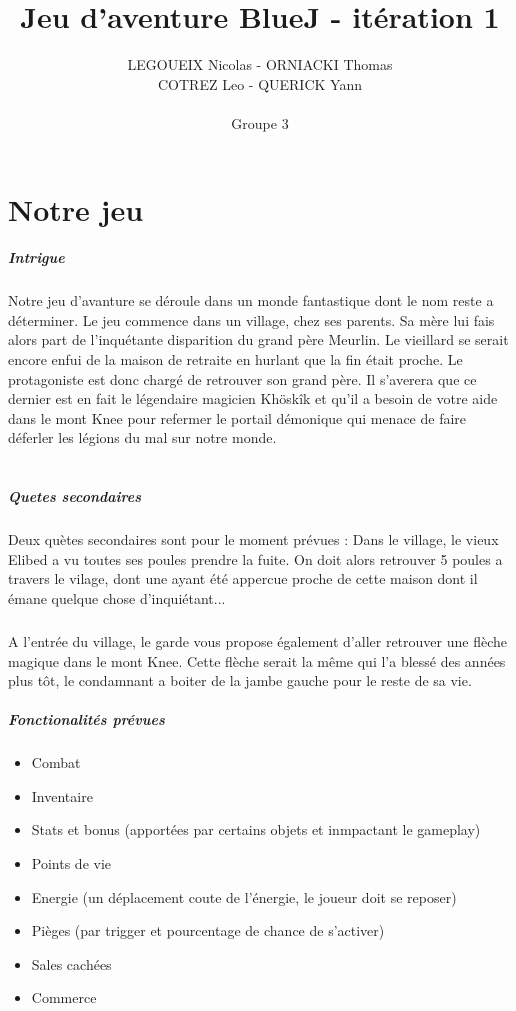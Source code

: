 \documentclass[11pt,a4paper]{report}
\author{LEGOUEIX Nicolas - ORNIACKI Thomas\\ COTREZ Leo - QUERICK Yann\\~\\ Groupe 3}
\title{Jeu d'aventure BlueJ - itération 1}
\begin{document}
\maketitle
\chapter{Notre jeu}
\paragraph{Intrigue}
Notre jeu d'avanture se déroule dans un monde fantastique dont le nom reste a déterminer. Le jeu commence dans un village, chez ses parents. Sa mère lui fais alors part de l'inquétante disparition du grand père Meurlin. Le vieillard se serait encore enfui de la maison de retraite en hurlant que la fin était proche. Le protagoniste est donc chargé de retrouver son grand père. Il s'averera que ce dernier est en fait le légendaire magicien Khöskîk et qu'il a besoin de votre aide dans le mont Knee pour refermer le portail démonique qui menace de faire déferler les légions du mal sur notre monde.\\~\\
\paragraph{Quetes secondaires}
Deux quètes secondaires sont pour le moment prévues : Dans le village, le vieux Elibed a vu toutes ses poules prendre la fuite. On doit alors retrouver 5 poules a travers le vilage, dont une ayant été appercue proche de cette maison dont il émane quelque chose d'inquiétant...
\paragraph{}
A l'entrée du village, le garde vous propose également d'aller retrouver une flèche magique dans le mont Knee. Cette flèche serait la même qui l'a blessé des années plus tôt, le condamnant a boiter de la jambe gauche pour le reste de sa vie.
\paragraph{Fonctionalités prévues}
\begin{itemize}
\item Combat
\item Inventaire
\item Stats et bonus (apportées par certains objets et inmpactant le gameplay)
\item Points de vie
\item Energie (un déplacement coute de l'énergie, le joueur doit se reposer)
\item Pièges (par trigger et pourcentage de chance de s'activer)
\item Sales cachées
\item Commerce
\end{itemize}
\end{document}
